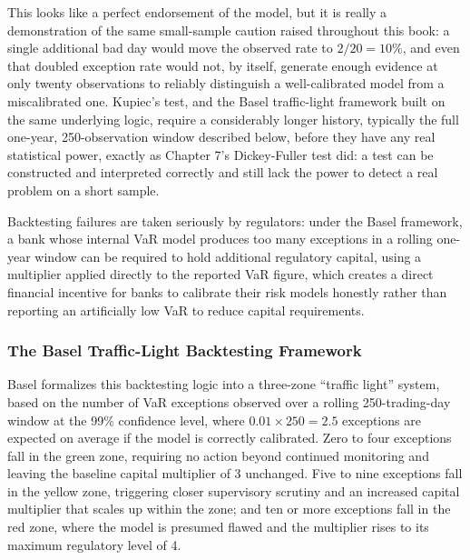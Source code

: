 \documentclass[../ai_in_finance]{subfiles}
\begin{document}
This looks like a perfect endorsement of the model, but it is really a demonstration of the same small-sample caution raised throughout this book: a single additional bad day would move the observed rate to $2/20=10\%$, and even that doubled exception rate would not, by itself, generate enough evidence at only twenty observations to reliably distinguish a well-calibrated model from a miscalibrated one. Kupiec's test, and the Basel traffic-light framework built on the same underlying logic, require a considerably longer history, typically the full one-year, 250-observation window described below, before they have any real statistical power, exactly as Chapter 7's Dickey-Fuller test did: a test can be constructed and interpreted correctly and still lack the power to detect a real problem on a short sample.

Backtesting failures are taken seriously by regulators: under the Basel framework, a bank whose internal VaR model produces too many exceptions in a rolling one-year window can be required to hold additional regulatory capital, using a multiplier applied directly to the reported VaR figure, which creates a direct financial incentive for banks to calibrate their risk models honestly rather than reporting an artificially low VaR to reduce capital requirements.

\subsubsection*{The Basel Traffic-Light Backtesting Framework}

Basel formalizes this backtesting logic into a three-zone ``traffic light'' system, based on the number of VaR exceptions observed over a rolling 250-trading-day window at the 99\% confidence level, where $0.01 \times 250 = 2.5$ exceptions are expected on average if the model is correctly calibrated. Zero to four exceptions fall in the green zone, requiring no action beyond continued monitoring and leaving the baseline capital multiplier of 3 unchanged.
Five to nine exceptions fall in the yellow zone, triggering closer supervisory scrutiny and an increased capital multiplier that scales up within the zone; and ten or more exceptions fall in the red zone, where the model is presumed flawed and the multiplier rises to its maximum regulatory level of 4.
\end{document}
